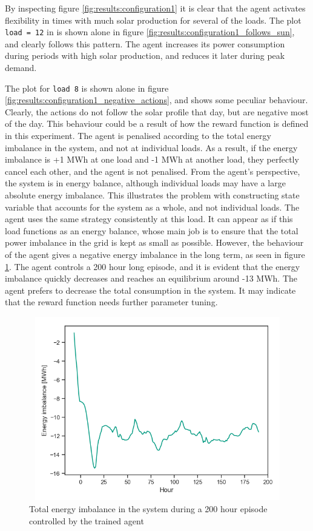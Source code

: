 \documentclass[class=book, crop=false, 11pt]{standalone}
\begin{document}
By inspecting figure \ref{fig:results:configuration1} it is clear that the agent activates flexibility in times with much solar production for several of the loads. The plot \texttt{load = 12} in is shown alone in figure \ref{fig:results:configuration1_follows_sun}, and clearly follows this pattern. The agent increases its power consumption during periods with high solar production, and reduces it later during peak demand.



The plot for \texttt{load 8} is shown alone in figure \ref{fig:results:configuration1_negative_actions}, and shows some peculiar behaviour. Clearly, the actions do not follow the solar profile that day, but are negative most of the day. This behaviour could be a result of how the reward function is defined in this experiment. The agent is penalised according to the total energy imbalance in the system, and not at individual loads. As a result, if the energy imbalance is +1 MWh at one load and -1 MWh at another load, they perfectly cancel each other, and the agent is not penalised. From the agent's perspective, the system is in energy balance, although individual loads may have a large absolute energy imbalance. This illustrates the problem with constructing state variable that accounts for the system as a whole, and not individual loads. The agent uses the same strategy consistently at this load. It can appear as if this load functions as an energy balance, whose main job is to ensure that the total power imbalance in the grid is kept as small as possible. However, the behaviour of the agent gives a negative energy imbalance in the long term, as seen in figure \ref{fig:results:configuration1_energy_imbalance}. The agent controls a 200 hour long episode, and it is evident that the energy imbalance quickly decreases and reaches an equilibrium around -13 MWh. The agent prefers to decrease the total consumption in the system. It may indicate that the reward function needs further parameter tuning.
\begin{figure}[H]
    \center
\includegraphics[height=8cm, width=12cm]{figures/configuration1_imbalance.png}
    \caption {Total energy imbalance in the system during a 200 hour episode controlled by the trained agent}
    \label{fig:results:configuration1_energy_imbalance}
\end{figure}
\end{document}
